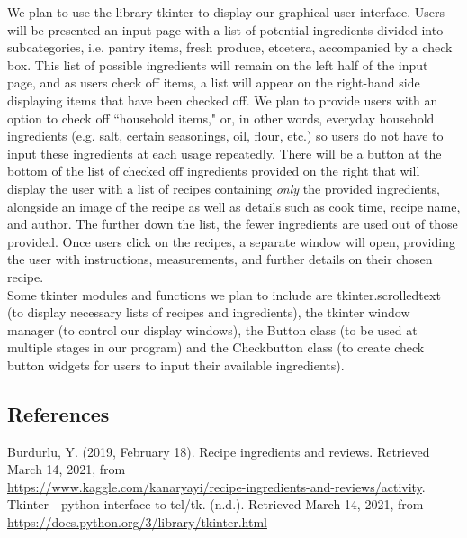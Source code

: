 \documentclass[fontsize=11pt]{article}
\begin{document}
    We plan to use the library tkinter to display our graphical user interface. Users will be presented an input page with a list of potential ingredients divided into subcategories, i.e. pantry items, fresh produce, etcetera, accompanied by a check box. This list of possible ingredients will remain on the left half of the input page, and as users check off items, a list will appear on the right-hand side displaying items that have been checked off. We plan to provide users with an option to check off ``household items," or, in other words, everyday household ingredients (e.g. salt, certain seasonings, oil, flour, etc.) so users do not have to input these ingredients at each usage repeatedly. There will be a button at the bottom of the list of checked off ingredients provided on the right that will display the user with a list of recipes containing \emph{only} the provided ingredients, alongside an image of the recipe as well as details such as cook time, recipe name, and author. The further down the list, the fewer ingredients are used out of those provided. Once users click on the recipes, a separate window will open, providing the user with instructions, measurements, and further details on their chosen recipe. \\

    Some tkinter modules and functions we plan to include are tkinter.scrolledtext (to display necessary lists of recipes and ingredients), the tkinter window manager (to control our display windows), the Button class (to be used at multiple stages in our program) and the Checkbutton class (to create check button widgets for users to input their available ingredients). \\


    \begin{center}
        \section*{References}
    \end{center}


    \begin{hangparas}{.25in}{1}
        Burdurlu, Y. (2019, February 18). Recipe ingredients and reviews. Retrieved March 14, 2021, from \\
        \url{https://www.kaggle.com/kanaryayi/recipe-ingredients-and-reviews/activity}. \\

        Tkinter - python interface to tcl/tk. (n.d.). Retrieved March 14, 2021, from \\ \url{https://docs.python.org/3/library/tkinter.html}
    \end{hangparas}
\end{document}
